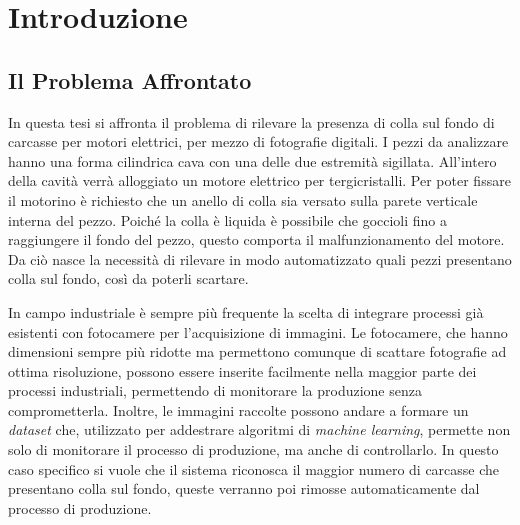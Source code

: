 
\chapter{Introduzione}

\section{Il Problema Affrontato}
In questa tesi si affronta il problema di rilevare la presenza di colla sul fondo di carcasse per motori elettrici, per mezzo di fotografie digitali.
I pezzi da analizzare hanno una forma cilindrica cava con una delle due estremità sigillata.
All'intero della cavità verrà alloggiato un motore elettrico per tergicristalli.
Per poter fissare il motorino è richiesto che un anello di colla sia versato sulla parete verticale interna del pezzo.
Poiché la colla è liquida è possibile che goccioli fino a raggiungere il fondo del pezzo, questo comporta il malfunzionamento del motore.
Da ciò nasce la necessità di rilevare in modo automatizzato quali pezzi presentano colla sul fondo, così da poterli scartare.

In campo industriale è sempre più frequente la scelta di integrare processi già esistenti con fotocamere per l'acquisizione di immagini.
Le fotocamere, che hanno dimensioni sempre più ridotte ma permettono comunque di scattare fotografie ad ottima risoluzione, possono essere inserite facilmente nella maggior parte dei processi industriali, permettendo di monitorare la produzione senza comprometterla.
Inoltre, le immagini raccolte possono andare a formare un \textit{dataset} che, utilizzato per addestrare algoritmi di \textit{machine learning}, permette non solo di monitorare il processo di produzione, ma anche di controllarlo.
In questo caso specifico si vuole che il sistema riconosca il maggior numero di carcasse che presentano colla sul fondo, queste verranno poi rimosse automaticamente dal processo di produzione.

